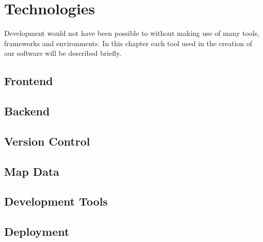 \section{Technologies}

Development would not have been possible to without making use of many tools, frameworks and environments. In this chapter each tool used in the creation of our software will be described briefly.

%

%

\subsection{Frontend}


\subsection{Backend}


\subsection{Version Control}


\subsection{Map Data}


\subsection{Development Tools}


\subsection{Deployment}
